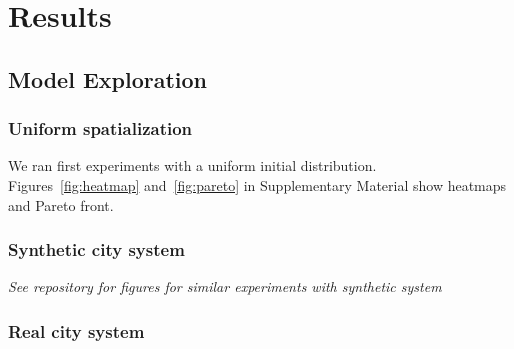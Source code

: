 \documentclass[fleqn,10pt]{wlscirep}
\begin{document}
{%











\section*{Results}











\subsection*{Model Exploration}


\subsubsection*{Uniform spatialization}

We ran first experiments with a uniform initial distribution. Figures~\ref{fig:heatmap} and~\ref{fig:pareto} in Supplementary Material show heatmaps and Pareto front.






\subsubsection*{Synthetic city system}

\textit{See repository for figures for similar experiments with synthetic system}

\subsubsection*{Real city system}

}
\end{document}
